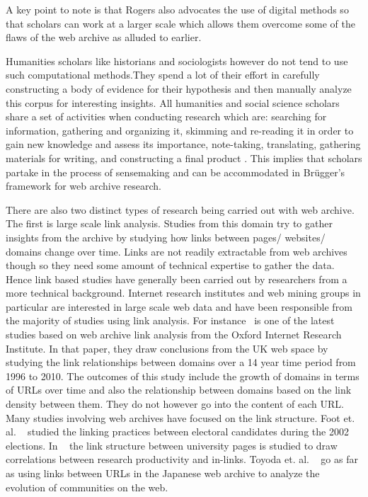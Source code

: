A key point to note is that Rogers also advocates the use of digital methods so that scholars can work at a larger scale which allows them overcome some of the flaws of the web archive as alluded to earlier.

Humanities scholars like historians and sociologists however do not tend to use such computational methods.They spend a lot of their effort in carefully constructing a body of evidence for their hypothesis and then manually analyze this corpus for interesting insights. All humanities and social science scholars share a set of activities when conducting research which are: searching for information, gathering and organizing it, skimming and re-reading it in order to gain new knowledge and assess its importance, note-taking, translating, gathering materials for writing, and constructing a final product \cite{palmer2008scholarship}. This implies that scholars partake in the process of sensemaking and can be accommodated in Br\"ugger's framework for web archive research.

There are also two distinct types of research being carried out with web archive. The first is large scale link analysis. Studies from this domain try to gather insights from the archive by studying how links between pages/ websites/ domains change over time. Links are not readily extractable from web archives though so they need some amount of technical expertise to gather the data. Hence link based studies have generally been carried out by researchers from a more technical background. Internet research institutes and web mining groups in particular are interested in large scale web data and have been responsible from the majority of studies using link analysis. For instance~\cite{hale2014mapping} is one of the latest studies based on web archive link analysis from the Oxford Internet Research Institute. In that paper, they draw conclusions from the UK web space by studying the link relationships between domains over a 14 year time period from 1996 to 2010. The outcomes of this study include the growth of domains in terms of URLs over time and also the relationship between domains based on the link density between them. They do not however go into the content of each URL. Many studies involving web archives have focused on the link structure. Foot et. al. ~\cite{foot2003analyzing} studied the linking practices between electoral candidates during the 2002 elections. In ~\cite{payne2008longitudinal} the link structure between university pages is studied to draw correlations between research productivity and in-links. Toyoda et. al. ~\cite{toyoda2003extracting} go as far as using links between URLs in the Japanese web archive to analyze the evolution of communities on the web. 


